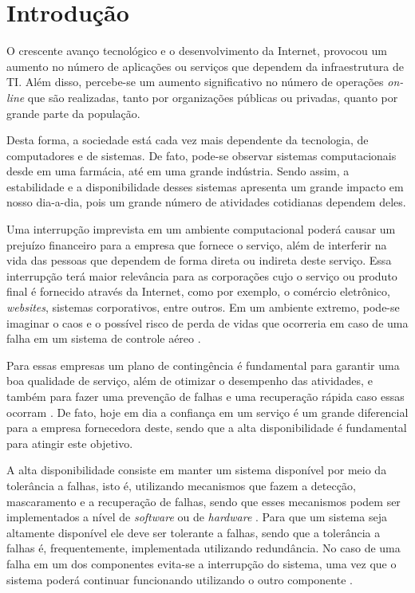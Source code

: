 \chapter{Introdução}
O crescente avanço tecnológico e o desenvolvimento da Internet, provocou um aumento no número de aplicações ou serviços que dependem da 
infraestrutura de \ac{TI}. Além disso, percebe-se um aumento significativo no número de operações \textit{on-line} que são realizadas, 
tanto por organizações públicas ou privadas, quanto por grande parte da população.

Desta forma, a sociedade está cada vez mais dependente da tecnologia, de computadores e de sistemas. De fato, pode-se observar 
sistemas computacionais desde em uma farmácia, até em uma grande indústria. Sendo assim, a estabilidade e a disponibilidade desses 
sistemas apresenta um grande impacto em nosso dia-a-dia, pois um grande número de atividades cotidianas dependem deles.

Uma interrupção imprevista em um ambiente computacional poderá causar um prejuízo financeiro para a empresa que fornece o serviço, 
além de interferir na vida das pessoas que dependem de forma direta ou indireta deste serviço. 
Essa interrupção terá maior relevância para as corporações cujo o serviço ou produto final é fornecido através da Internet, 
como por exemplo, o comércio eletrônico, \textit{websites}, sistemas corporativos, entre outros. 
Em um ambiente extremo, pode-se imaginar o caos e o possível risco de perda de vidas que ocorreria em caso de uma falha 
em um sistema de controle aéreo \cite{costa2009}.

Para essas empresas um plano de contingência é fundamental para garantir uma boa qualidade de serviço, além de otimizar o desempenho 
das atividades, e também para fazer uma prevenção de falhas e uma recuperação rápida caso essas ocorram \cite{costa2009}.
De fato, hoje em dia a confiança em um serviço é um grande diferencial para a empresa fornecedora deste, 
sendo que a alta disponibilidade é fundamental para atingir este objetivo.

A alta disponibilidade consiste em manter um sistema disponível por meio da tolerância a falhas, isto é, utilizando mecanismos que fazem a 
detecção, mascaramento e a recuperação de falhas, sendo que esses mecanismos podem ser implementados a nível de \textit{software} ou de 
\textit{hardware} \cite{reis2009}. Para que um sistema seja altamente disponível ele deve ser tolerante a falhas, sendo que a tolerância
a falhas é, frequentemente, implementada utilizando redundância. No caso de uma falha em um dos componentes evita-se a interrupção do sistema,
uma vez que o sistema poderá continuar funcionando utilizando o outro componente \cite{batista2007}.


